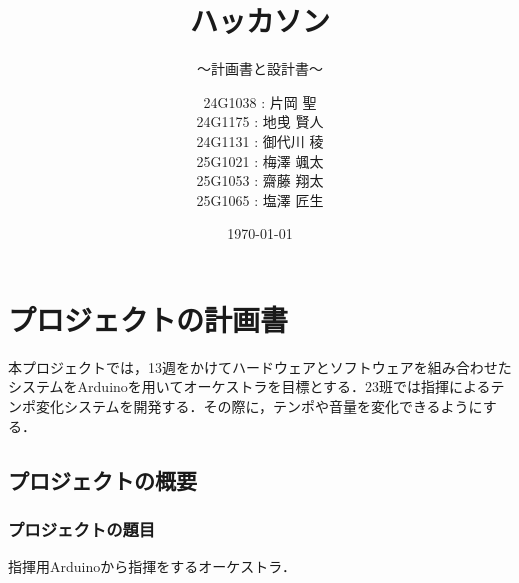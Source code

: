 \documentclass[lualatex,book,paper=a4paper,jafontsize=11.5pt,jafontscale=1.05]{jlreq}
\title{ハッカソン}
\subtitle{～計画書と設計書～}
\author{
	24G1038 : 片岡 聖\\
        24G1175 : 地曵 賢人\\
        24G1131 : 御代川 稜\\
        25G1021 : 梅澤 颯太\\
        25G1053 : 齋藤 翔太\\
        25G1065 : 塩澤 匠生 
        }
\date{\today}
\begin{document}
\maketitle

\setcounter{tocdepth}{2}
\tableofcontents \thispagestyle{empty}

\chapter{プロジェクトの計画書} \label{chap:project-plan}\setcounter{page}{1}
本プロジェクトでは，13週をかけてハードウェアとソフトウェアを組み合わせたシステムをArduinoを用いてオーケストラを目標とする．23班では指揮によるテンポ変化システムを開発する．その際に，テンポや音量を変化できるようにする．

\section{プロジェクトの概要}
\subsection{プロジェクトの題目}
指揮用Arduinoから指揮をするオーケストラ．
\end{document}
